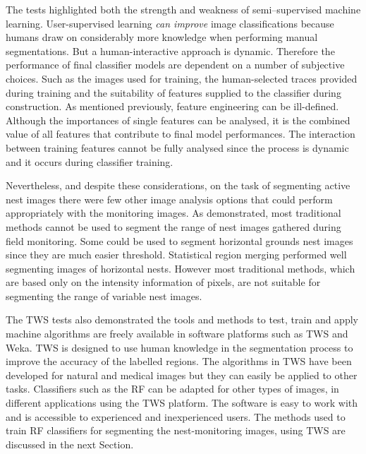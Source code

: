 The tests highlighted both the strength and weakness of semi--supervised machine learning. User-supervised learning \emph{can improve} image classifications because humans draw on considerably more knowledge when performing manual
segmentations. But a human-interactive approach is dynamic. Therefore the performance of final classifier models are dependent on a number of subjective choices. Such as the images used for training, the human-selected traces provided during training and the suitability of features supplied to the classifier during construction. As mentioned previously, feature engineering can be ill-defined. Although the importances of single features can be analysed, it is the combined value of all features that contribute to final model performances. The interaction between training features cannot be fully analysed since the process is dynamic and it occurs during classifier training.

Nevertheless, and despite these considerations, on the task of segmenting active nest images there were few other image analysis options that could perform appropriately with the monitoring images. As demonstrated, most traditional methods cannot be used to segment the range of nest images gathered during field monitoring. Some could be used to segment horizontal grounds nest images since they are much easier threshold. Statistical region merging performed well segmenting images of horizontal nests. However most traditional methods, which are based only on the intensity information of pixels, are not suitable for segmenting the range of variable nest images. 

The \ac{TWS} tests also demonstrated the tools and methods to test, train and apply machine algorithms are freely available in software platforms such as \ac{TWS} and \ac{Weka}. \ac{TWS} is designed to use human knowledge in the segmentation process to improve the accuracy of the labelled regions. The algorithms in \ac{TWS} have been developed for natural and medical images but they can easily be applied to other tasks. Classifiers such as the \ac{RF} can be adapted for other types of images, in different applications using the \ac{TWS} platform. The software is easy to work with and is accessible to experienced and inexperienced users. The methods used to train \ac{RF} classifiers for segmenting the nest-monitoring images, using \ac{TWS} are discussed in the next Section. 

